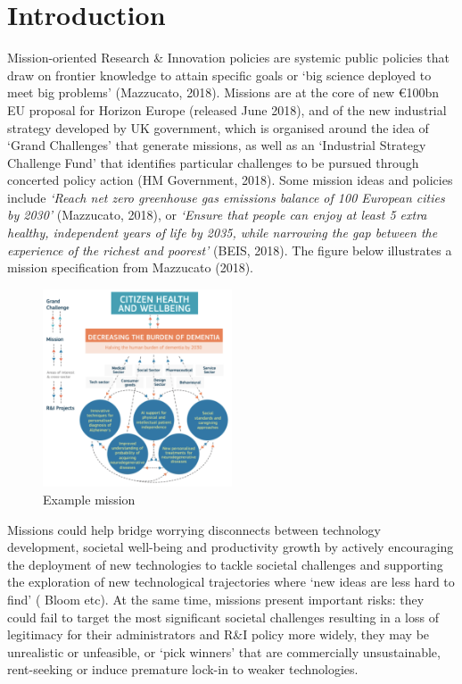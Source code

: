 \documentclass[11pt]{article}
\begin{document}
\section{Introduction}
\label{sec:introduction}

Mission-oriented Research \& Innovation policies are systemic public policies that draw on frontier knowledge to attain specific goals or `big science deployed to meet big problems' (Mazzucato, 2018). Missions are at the core of new €100bn EU proposal for Horizon Europe (released June 2018), and of the new industrial strategy developed by UK government, which is organised around the idea of `Grand Challenges’ that generate missions, as well as an `Industrial Strategy Challenge Fund’ that identifies particular challenges to be pursued through concerted policy action (HM Government, 2018). Some mission ideas and policies include \textit{`Reach net zero greenhouse gas emissions balance of 100 European cities
by 2030'} (Mazzucato, 2018), or \textit{`Ensure that people can enjoy at least 5 extra healthy, independent years of life by 2035, while narrowing the gap between the experience of the richest and poorest'} (BEIS, 2018). The figure below illustrates a mission specification from Mazzucato (2018).

\begin{figure}[!ht]
    \centering
    \includegraphics[width=0.5\textwidth]{figures/fig1_example.png}
    \caption{Example mission}
    \label{fig:my_label}
\end{figure}

Missions could help bridge worrying disconnects between technology development, societal well-being and productivity growth by actively encouraging the deployment of new technologies to tackle societal challenges and supporting the exploration of new technological trajectories where `new ideas are less hard to find' ( Bloom etc). At the same time, missions present important risks: they could fail to target the most significant societal challenges resulting in a loss of legitimacy for their administrators and R\&I policy more widely, they may be unrealistic or unfeasible, or `pick winners' that are commercially unsustainable, rent-seeking or induce premature lock-in to weaker technologies. 
\end{document}
